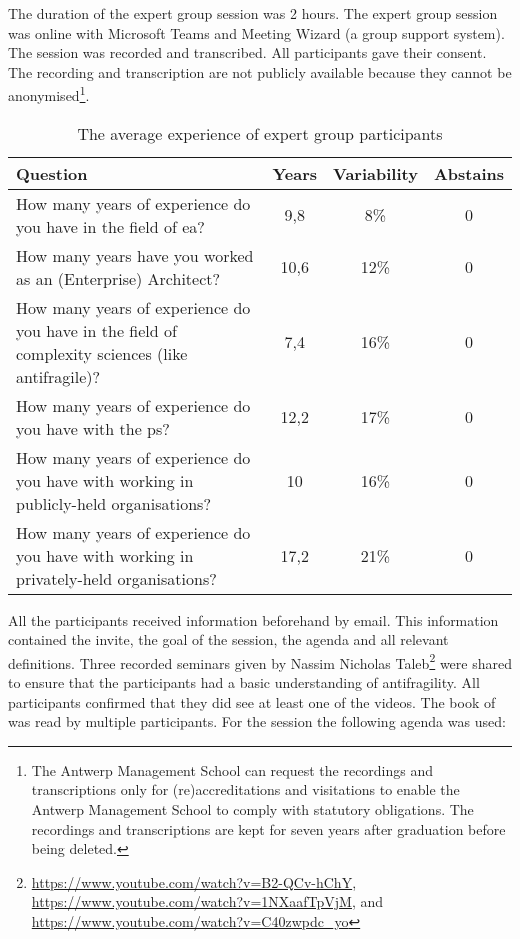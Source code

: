 The duration of the expert group session was 2 hours. The expert group session was online with Microsoft Teams and Meeting Wizard (a group support system). The session was recorded and transcribed. All participants gave their consent. The recording and transcription are not publicly available because they cannot be anonymised\footnote{The Antwerp Management School can request the recordings and transcriptions only for (re)accreditations and visitations to enable the Antwerp Management School to comply with statutory obligations. The recordings and transcriptions are kept for seven years after graduation before being deleted.}.
\begin{table}[H]
	\centering
	\begin{tabular}{p{}ccc}
		\toprule
		\textbf{Question} & \textbf{Years} & \textbf{Variability} & \textbf{Abstains} \\
		\midrule
		How many years of experience do you have in the field of \acrlong{ea}? & 9,8 & 8\% & 0 \\%
		How many years have you worked as an (Enterprise) Architect? & 10,6 & 12\% & 0 \\%
		How many years of experience do you have in the field of complexity sciences (like \gls{antifragile})? & 7,4 & 16\% & 0 \\%
		How many years of experience do you have with the \gls{ps}? & 12,2 & 17\% & 0 \\%
		How many years of experience do you have with working in publicly-held organisations? & 10 & 16\% & 0 \\%
		How many years of experience do you have with working in privately-held organisations? & 17,2 & 21\% & 0 \\%
		\bottomrule
	\end{tabular}%
	\caption[The average experience of expert group participants]{The average experience of expert group participants}
	\label{tab:experiencevalidationgroup}%
\end{table}%
All the participants received information beforehand by email. This information contained the invite, the goal of the session, the agenda and all relevant definitions. Three recorded seminars given by Nassim Nicholas Taleb\footnote{\url{https://www.youtube.com/watch?v=B2-QCv-hChY}, \url{https://www.youtube.com/watch?v=1NXaafTpVjM}, and \url{https://www.youtube.com/watch?v=C40zwpdc_yo}} were shared to ensure that the participants had a basic understanding of \gls{antifragility}. All participants confirmed that they did see at least one of the videos. The book of \textcite{Taleb2012} was read by multiple participants. For the session the following agenda was used:
